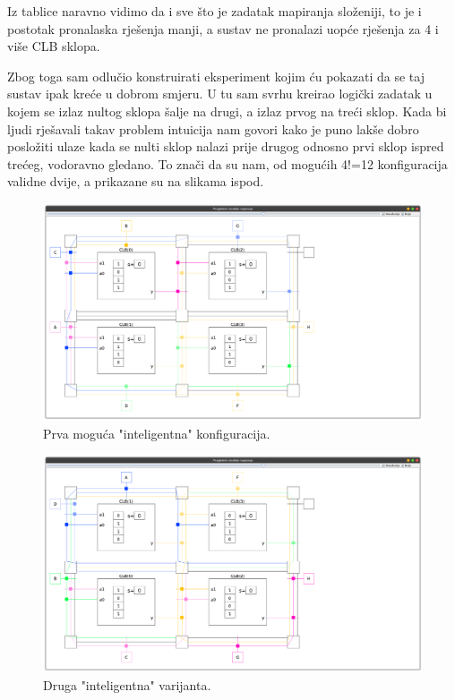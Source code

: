 \documentclass[times, utf8, zavrsni]{fer}
\begin{document}
		Iz tablice naravno vidimo da i sve što je zadatak mapiranja složeniji, to je i postotak pronalaska rješenja manji, a sustav ne pronalazi uopće rješenja za 4 i više CLB sklopa. 
		
		Zbog toga sam odlučio konstruirati eksperiment kojim ću pokazati da se taj sustav ipak kreće u dobrom smjeru. U tu sam svrhu kreirao logički zadatak u kojem se izlaz nultog sklopa šalje na drugi, a izlaz prvog na treći sklop. Kada bi ljudi rješavali takav problem intuicija nam govori kako je puno lakše dobro posložiti ulaze kada se nulti sklop nalazi prije drugog odnosno prvi sklop ispred trećeg, vodoravno gledano. To znači da su nam, od mogućih 4!=12 konfiguracija validne dvije, a prikazane su na slikama ispod.
		
		
		\begin{figure}[H]
			\centering
			\includegraphics[width=18cm]{slike/conf1.png}
			\caption{Prva moguća "inteligentna" konfiguracija. }
			\label{fig:conf1}
		\end{figure} 
		
		
		\begin{figure}[H]
			\centering
			\includegraphics[width=18cm]{slike/conf2.png}
			\caption{Druga "inteligentna" varijanta. }
			\label{fig:conf2}
		\end{figure} 
		
\end{document}
